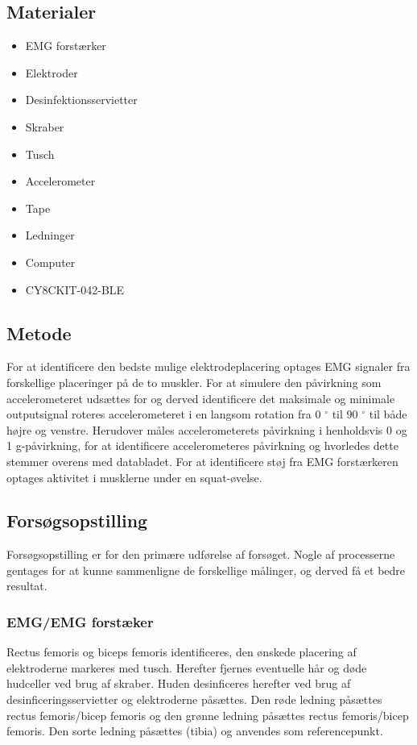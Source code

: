 \subsection{Materialer}  
\begin{itemize}
\item EMG forstærker
\item Elektroder
\item Desinfektionsservietter
\item Skraber
\item Tusch 

\item Accelerometer
\item Tape
\item Ledninger

\item Computer
\item CY8CKIT-042-BLE
\end{itemize}

\subsection{Metode}

For at identificere den bedste mulige elektrodeplacering optages EMG signaler fra forskellige placeringer på de to muskler. 
For at simulere den påvirkning som accelerometeret udsættes for og derved identificere det maksimale og minimale outputsignal roteres accelerometeret i en langsom rotation fra 0 $^{\circ}$ til 90 $^{\circ}$ til både højre og venstre. Herudover måles accelerometerets påvirkning i henholdsvis 0 og 1 g-påvirkning, for at identificere accelerometeres påvirkning og hvorledes dette stemmer overens med databladet. 
For at identificere støj fra EMG forstærkeren optages aktivitet i musklerne under en squat-øvelse.
 

\subsection{Forsøgsopstilling}
Forsøgsopstilling er for den primære udførelse af forsøget. Nogle af processerne gentages for at kunne sammenligne de forskellige målinger, og derved få et bedre resultat.

\subsubsection{EMG/EMG forstæker}
Rectus femoris og biceps femoris identificeres, den ønskede placering af elektroderne markeres med tusch. Herefter fjernes eventuelle hår og døde hudceller ved brug af skraber. Huden desinficeres herefter ved brug af desinficeringsservietter og elektroderne påsættes. Den røde ledning påsættes rectus femoris/bicep femoris og den grønne ledning påsættes rectus femoris/bicep femoris. Den sorte ledning påsættes (tibia) og anvendes som referencepunkt.

